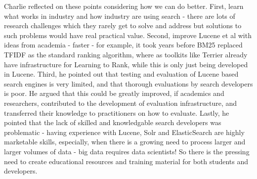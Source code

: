 Charlie reflected on these points considering how we can do better. First, learn what works in industry and how industry are using search - there are lots of research challenges which they rarely get to solve and address but solutions to such problems would have real practical value. Second, improve Lucene et al with ideas from academia - faster - for example, it took years before BM25 replaced TFIDF as the standard ranking algorithm, where as  toolkits like Terrier already have infrastructure for Learning to Rank, while this is only just being developed in Lucene. Third, he pointed out that testing and evaluation of Lucene based search engines is very limited, and that thorough evaluations by search developers is poor. He argued that this could be greatly improved, if academics and researchers, contributed to the development of evaluation infrastructure, and transferred their knowledge to practitioners on how to evaluate. Lastly, he pointed that the lack of skilled and knowledgable search developers was problematic - having experience with Lucene, Solr and ElasticSearch are highly marketable skills, especially, when there is a growing need to process larger and larger volumes of data - big data requires data scientists! So there is the pressing need to create educational resources and training material for both students and developers. 



 




